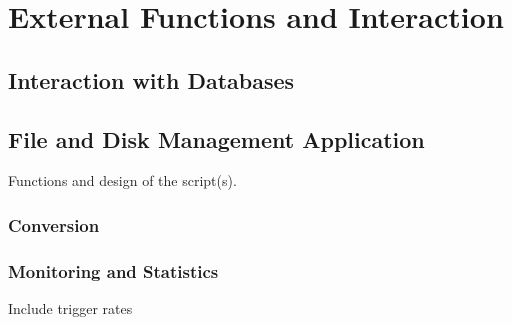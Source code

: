 \section{External Functions and Interaction}

\subsection{Interaction with Databases}

\subsection{File and Disk Management Application}

Functions and design of the script(s).

\subsubsection{Conversion}

\subsubsection{Monitoring and Statistics}

Include trigger rates